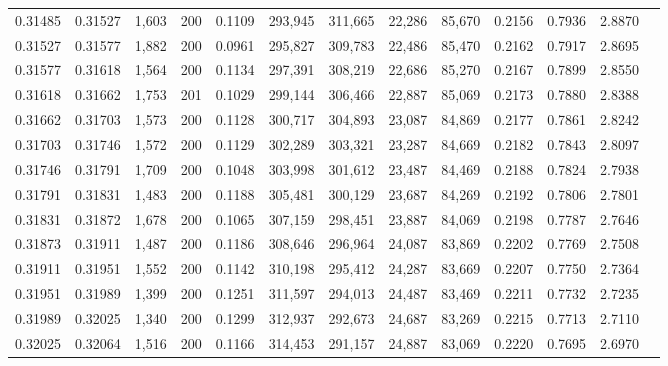 \begin{tabular}{rrrrrrrrrrrrr}
0.31485 & 0.31527 & 1,603 & 200 &                                     0.1109 & 293,945 & 311,665 &  22,286 &  85,670 & 0.2156 & 0.7936 & 2.8870 \\
0.31527 & 0.31577 & 1,882 & 200 &                                     0.0961 & 295,827 & 309,783 &  22,486 &  85,470 & 0.2162 & 0.7917 & 2.8695 \\
0.31577 & 0.31618 & 1,564 & 200 &                                     0.1134 & 297,391 & 308,219 &  22,686 &  85,270 & 0.2167 & 0.7899 & 2.8550 \\
0.31618 & 0.31662 & 1,753 & 201 &                                     0.1029 & 299,144 & 306,466 &  22,887 &  85,069 & 0.2173 & 0.7880 & 2.8388 \\
0.31662 & 0.31703 & 1,573 & 200 &                                     0.1128 & 300,717 & 304,893 &  23,087 &  84,869 & 0.2177 & 0.7861 & 2.8242 \\
0.31703 & 0.31746 & 1,572 & 200 &                                     0.1129 & 302,289 & 303,321 &  23,287 &  84,669 & 0.2182 & 0.7843 & 2.8097 \\
0.31746 & 0.31791 & 1,709 & 200 &                                     0.1048 & 303,998 & 301,612 &  23,487 &  84,469 & 0.2188 & 0.7824 & 2.7938 \\
0.31791 & 0.31831 & 1,483 & 200 &                                     0.1188 & 305,481 & 300,129 &  23,687 &  84,269 & 0.2192 & 0.7806 & 2.7801 \\
0.31831 & 0.31872 & 1,678 & 200 &                                     0.1065 & 307,159 & 298,451 &  23,887 &  84,069 & 0.2198 & 0.7787 & 2.7646 \\
0.31873 & 0.31911 & 1,487 & 200 &                                     0.1186 & 308,646 & 296,964 &  24,087 &  83,869 & 0.2202 & 0.7769 & 2.7508 \\
0.31911 & 0.31951 & 1,552 & 200 &                                     0.1142 & 310,198 & 295,412 &  24,287 &  83,669 & 0.2207 & 0.7750 & 2.7364 \\
0.31951 & 0.31989 & 1,399 & 200 &                                     0.1251 & 311,597 & 294,013 &  24,487 &  83,469 & 0.2211 & 0.7732 & 2.7235 \\
0.31989 & 0.32025 & 1,340 & 200 &                                     0.1299 & 312,937 & 292,673 &  24,687 &  83,269 & 0.2215 & 0.7713 & 2.7110 \\
0.32025 & 0.32064 & 1,516 & 200 &                                     0.1166 & 314,453 & 291,157 &  24,887 &  83,069 & 0.2220 & 0.7695 & 2.6970 \\

\end{tabular}
